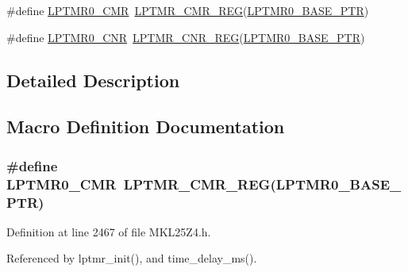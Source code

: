 \begin{DoxyCompactItemize}
\item 
\#define \hyperlink{group___l_p_t_m_r___register___accessor___macros_gac109508795b1b22820940313ddb4c620}{L\+P\+T\+M\+R0\+\_\+\+C\+MR}~\hyperlink{group___l_p_t_m_r___register___accessor___macros_ga7a7ca80913d5f4e2ceed4be05272267a}{L\+P\+T\+M\+R\+\_\+\+C\+M\+R\+\_\+\+R\+EG}(\hyperlink{group___l_p_t_m_r___peripheral_ga90a9194151ad11b422bcab162e797eda}{L\+P\+T\+M\+R0\+\_\+\+B\+A\+S\+E\+\_\+\+P\+TR})
\item 
\#define \hyperlink{group___l_p_t_m_r___register___accessor___macros_gada9bf6b3d564321571ac27faa4d263ad}{L\+P\+T\+M\+R0\+\_\+\+C\+NR}~\hyperlink{group___l_p_t_m_r___register___accessor___macros_gac2f4b2b992990404896f3b23f4d666cb}{L\+P\+T\+M\+R\+\_\+\+C\+N\+R\+\_\+\+R\+EG}(\hyperlink{group___l_p_t_m_r___peripheral_ga90a9194151ad11b422bcab162e797eda}{L\+P\+T\+M\+R0\+\_\+\+B\+A\+S\+E\+\_\+\+P\+TR})
\end{DoxyCompactItemize}


\subsection{Detailed Description}


\subsection{Macro Definition Documentation}
\subsubsection[{\texorpdfstring{L\+P\+T\+M\+R0\+\_\+\+C\+MR}{LPTMR0_CMR}}]{\setlength{\rightskip}{0pt plus 5cm}\#define L\+P\+T\+M\+R0\+\_\+\+C\+MR~{\bf L\+P\+T\+M\+R\+\_\+\+C\+M\+R\+\_\+\+R\+EG}({\bf L\+P\+T\+M\+R0\+\_\+\+B\+A\+S\+E\+\_\+\+P\+TR})}\hypertarget{group___l_p_t_m_r___register___accessor___macros_gac109508795b1b22820940313ddb4c620}{}\label{group___l_p_t_m_r___register___accessor___macros_gac109508795b1b22820940313ddb4c620}


Definition at line 2467 of file M\+K\+L25\+Z4.\+h.



Referenced by lptmr\+\_\+init(), and time\+\_\+delay\+\_\+ms().

